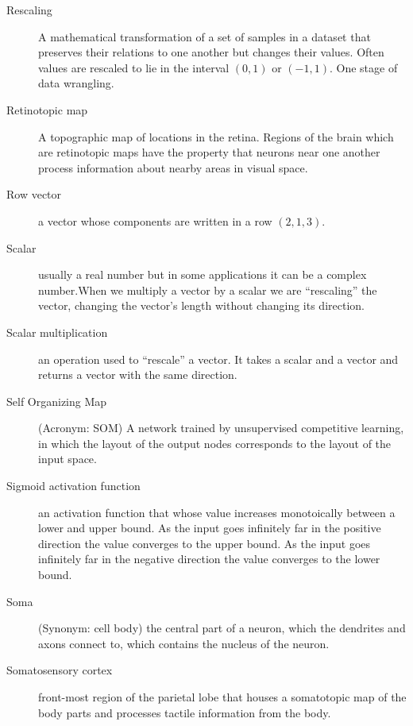 \begin{description}
\item[Rescaling] A mathematical transformation of a set of samples in a dataset that preserves their relations to one another but changes their values. Often values are rescaled to lie in the interval $(0,1)$ or $(-1,1)$. One stage of data wrangling.


\item[Retinotopic map] A topographic map of locations in the retina. Regions of the brain which are retinotopic maps have the property that neurons near one another process information about nearby areas in visual space.

\item[Row vector] a vector whose components are written in a row \eg $(2,1,3)$.

\item[Scalar] usually a real number but in some applications it can be a complex number.When we multiply a vector by a scalar we are ``rescaling'' the vector, \ie changing the vector's length without changing its direction.

\item[Scalar multiplication] an operation used to ``rescale'' a vector. It takes a scalar and a vector and returns a vector with the same direction.

\item[Self Organizing Map] (Acronym: SOM)  A network trained by unsupervised competitive learning, in which the layout of the output nodes corresponds to the layout of the input space.

\item[Sigmoid activation function] an activation function that whose value increases  monotoically between a lower and upper bound. As the input goes infinitely far in the positive direction the value converges to the upper bound. As the input goes infinitely far in the negative direction the value converges to the lower bound.


\item[Soma] (Synonym: cell body) the central part of a neuron, which the dendrites and axons connect to, which contains the nucleus of the neuron.

\item[Somatosensory cortex] front-most region of the parietal lobe that houses a somatotopic map of the body parts and processes tactile information from the body.


\end{description}
